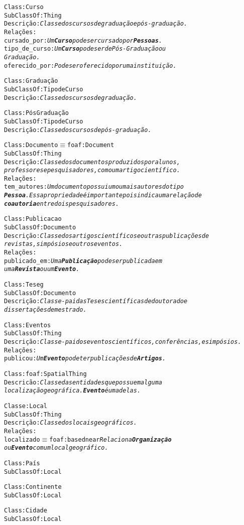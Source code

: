 \begin{alltt}
Class: Curso
SubClassOf: Thing
Descrição: \emph{Classe dos cursos de graduação e pós-graduação.}
Relações:
  cursado_por: \emph{Um \textbf{Curso} pode ser cursado por \textbf{Pessoas}.}
  tipo_de_curso: \emph{Um \textbf{Curso} pode ser de Pós-Graduação ou
  Graduação.}
  oferecido_por: \emph{Pode ser oferecido por uma instituição.}

Class: Graduação
SubClassOf: Tipo de Curso
Descrição: \emph{Classe dos cursos de graduação.}

Class: Pós Graduação
SubClassOf: Tipo de Curso
Descrição: \emph{Classe dos cursos de pós-graduação.}

Class: Documento \( \equiv \) foaf:Document
SubClassOf: Thing
Descrição: \emph{Classe dos documentos produzidos por alunos,
professores e pesquisadores, como um artigo científico.}
Relações:
  tem_autores: \emph{Um documento possui um ou mais autores do tipo
  \textbf{Pessoa}. Essa propriedade é importante pois indica uma relação de
  \textbf{coautoria} entre dois pesquisadores.}

Class: Publicacao
SubClassOf: Documento
Descrição: \emph{Classe dos artigos científicos e outras publicações de
revistas, simpósios e outros eventos.}
Relações:
  publicado_em: \emph{Uma \textbf{Publicação} pode ser publicada em
  uma \textbf{Revista} ou um \textbf{Evento}.}

Class: Teseg
SubClassOf: Documento
Descrição: \emph{Classe-pai das Teses científicas de doutorado e
dissertações de mestrado.}

Class: Eventos
SubClassOf: Thing
Descrição: \emph{Classe-pai dos eventos científicos, conferências, e simpósios.}
Relações:
  publicou: \emph{Um \textbf{Evento} pode ter publicações de \textbf{Artigos}.}

Class: foaf:Spatial Thing
Descricão: \emph{Classe das entidades que possuem alguma
localização geográfica. \textbf{Evento} é uma delas.}

Classe: Local
SubClassOf: Thing
Descrição: \emph{Classe dos locais geográficos.}
Relações:
  localizado \( \equiv \) foaf:based near \emph{Relaciona \textbf{Organização}
  ou \textbf{Evento} com um local geográfico.}

Class: País
SubClassOf: Local

Class: Continente
SubClassOf: Local

Class: Cidade
SubClassOf: Local

\end{alltt}

